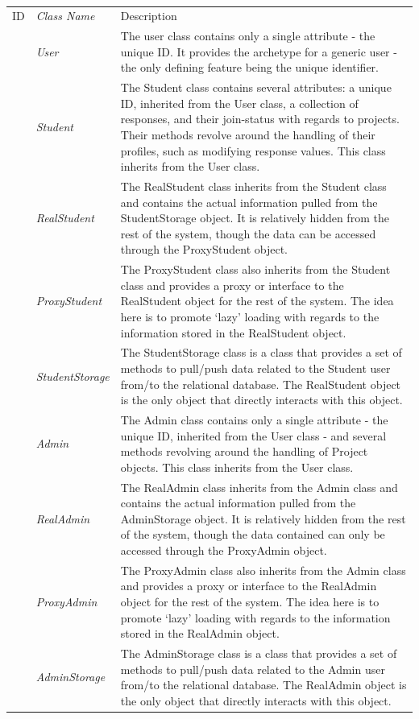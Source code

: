 \documentclass[12pt,letterpaper]{article}
\begin{document}
\begin{table}[H]
\caption{} 
\begin{tabu} to 
	\tableheader{}ID & Class Name & Description \\
	 & User & The user class contains only a single attribute - the unique ID. It provides the archetype for a generic user - the only defining feature being the unique identifier.\\
	 & Student & The Student class contains several attributes: a unique ID, inherited from the User class, a collection of responses, and their join-status with regards to projects. Their methods revolve around the handling of their profiles, such as modifying response values. This class inherits from the User class. \\
	 & RealStudent & The RealStudent class inherits from the Student class and contains the actual information pulled from the StudentStorage object. It is relatively hidden from the rest of the system, though the data can be accessed through the ProxyStudent object.\\
	 & ProxyStudent & The ProxyStudent class also inherits from the Student class and provides a proxy or interface to the RealStudent object for the rest of the system. The idea here is to promote `lazy' loading with regards to the information stored in the RealStudent object.\\
	 & StudentStorage & The StudentStorage class is a class that provides a set of methods to pull/push data related to the Student user from/to the relational database. The RealStudent object is the only object that directly interacts with this object.\\
	 & Admin & The Admin class contains only a single attribute - the unique ID, inherited from the User class - and several methods revolving around the handling of Project objects. This class inherits from the User class.  \\
	 & RealAdmin & The RealAdmin class inherits from the Admin class and contains the actual information pulled from the AdminStorage object. It is relatively hidden from the rest of the system, though the data contained can only be accessed through the ProxyAdmin object. \\
	 & ProxyAdmin & The ProxyAdmin class also inherits from the Admin class and provides a proxy or interface to the RealAdmin object for the rest of the system. The idea here is to promote `lazy' loading with regards to the information stored in the RealAdmin object.\\
	 & AdminStorage & The AdminStorage class is a class that provides a set of methods to pull/push data related to the Admin user from/to the relational database. The RealAdmin object is the only object that directly interacts with this object.\\
\end{tabu}
\end{table}
\end{document}

